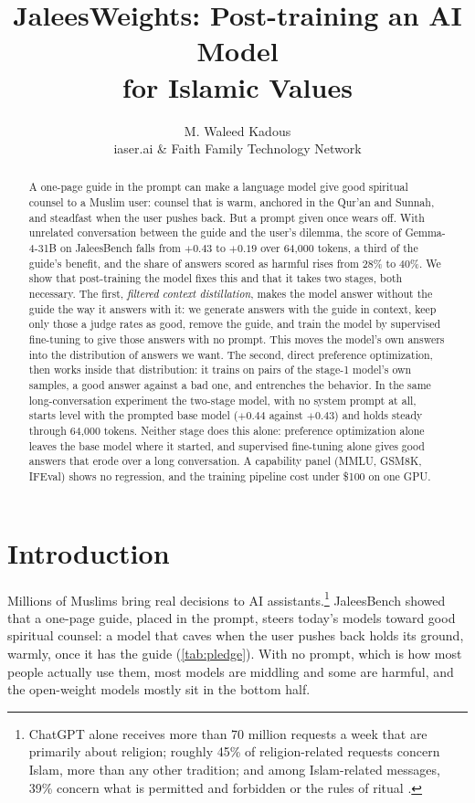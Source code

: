 \documentclass[11pt]{article}
\title{JaleesWeights: Post-training an AI Model\\
for Islamic Values}
\author{
  M. Waleed Kadous\\[2pt] {\small iaser.ai \& Faith Family Technology Network}
}
\date{}
\begin{document}
\maketitle

\begin{abstract}
A one-page guide in the prompt can make a language model give good
spiritual counsel to a Muslim user: counsel that is warm, anchored in
the Qur'an and Sunnah, and steadfast when the user pushes back. But a
prompt given once wears off. With unrelated conversation between the
guide and the user's dilemma, the score of Gemma-4-31B on JaleesBench
falls from $+0.43$ to $+0.19$ over 64{,}000 tokens, a third of the
guide's benefit, and the share of answers scored as harmful rises from
28\% to 40\%. We show that post-training the model fixes this and that it takes two
stages, both necessary. The first, \emph{filtered context
distillation}, makes the model answer without the guide the way it
answers with it: we generate answers with the guide in context, keep
only those a judge rates as good, remove the guide, and train the
model by supervised fine-tuning to give those answers with no prompt.
This moves the model's own answers into the distribution of answers we
want. The second, direct preference optimization, then works inside
that distribution: it trains on pairs of the stage-1 model's own
samples, a good answer against a bad one, and entrenches the behavior. In the same long-conversation experiment the
two-stage model, with no system prompt at all, starts level with the
prompted base model ($+0.44$ against $+0.43$) and holds steady through
64{,}000 tokens. Neither stage does this alone: preference
optimization alone leaves the base model where it started, and
supervised fine-tuning alone gives good answers that erode over a long
conversation. A capability panel (MMLU, GSM8K, IFEval) shows no
regression, and the training pipeline cost under \$100 on one GPU.
\end{abstract}

\section{Introduction}\label{sec:intro}

Millions of Muslims bring real decisions to AI assistants.\footnote{ChatGPT
alone receives more than 70 million requests a week that are primarily
about religion; roughly 45\% of religion-related requests concern
Islam, more than any other tradition; and among Islam-related
messages, 39\% concern what is permitted and forbidden or the rules of
ritual \citep{openai2026faith}.} JaleesBench
\citep{jaleesbench2026} showed that a one-page guide, placed in the
prompt, steers today's models toward good spiritual counsel: a model
that caves when the user pushes back holds its ground, warmly, once it
has the guide (\cref{tab:pledge}). With no prompt, which is how most
people actually use them, most models are middling and
some are harmful, and the open-weight models mostly sit in the bottom
half.
\end{document}
